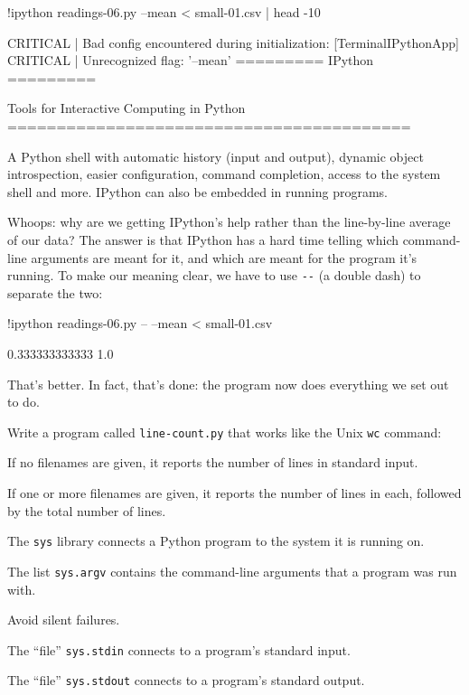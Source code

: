 \begin{VerbIn}
!ipython readings-06.py --mean < small-01.csv | head -10
\end{VerbIn}

\begin{VerbOut}
[TerminalIPythonApp] CRITICAL | Bad config encountered during initialization:
[TerminalIPythonApp] CRITICAL | Unrecognized flag: '--mean'
=========
 IPython
=========

Tools for Interactive Computing in Python
=========================================

    A Python shell with automatic history (input and output), dynamic object
    introspection, easier configuration, command completion, access to the
    system shell and more.  IPython can also be embedded in running programs.
\end{VerbOut}

Whoops: why are we getting IPython's help rather than the line-by-line
average of our data? The answer is that IPython has a hard time telling
which command-line arguments are meant for it, and which are meant for
the program it's running. To make our meaning clear, we have to use
\texttt{-{}-} (a double dash) to separate the two:

\begin{VerbIn}
!ipython readings-06.py -- --mean < small-01.csv
\end{VerbIn}

\begin{VerbOut}
0.333333333333
1.0
\end{VerbOut}

That's better. In fact, that's done: the program now does everything we
set out to do.

\begin{challenge}
  Write a program called \texttt{line-count.py} that works like the Unix
  \texttt{wc} command:

  \begin{swcitemize}
  \item
    If no filenames are given, it reports the number of lines in
    standard input.
  \item
    If one or more filenames are given, it reports the number of lines
    in each, followed by the total number of lines.
   \end{swcitemize}
\end{challenge}

\begin{keypoints}
\begin{swcitemize}
\item
  The \texttt{sys} library connects a Python program to the system it is
  running on.
\item
  The list \texttt{sys.argv} contains the command-line arguments that a
  program was run with.
\item
  Avoid silent failures.
\item
  The ``file'' \texttt{sys.stdin} connects to a program's standard
  input.
\item
  The ``file'' \texttt{sys.stdout} connects to a program's standard
  output.
\end{swcitemize}
\end{keypoints}
